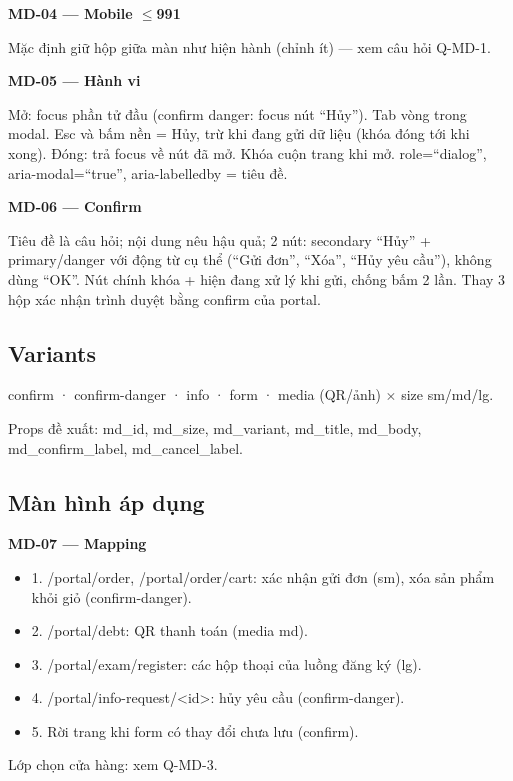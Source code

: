 \documentclass[11pt,a4paper]{report}
\begin{document}
\par\smallskip\textbf{MD-04 — Mobile \(\leq\)991}\par
Mặc định giữ hộp giữa màn như hiện hành (chỉnh ít) — xem câu hỏi Q-MD-1.\par

\par\smallskip\textbf{MD-05 — Hành vi}\par
Mở: focus phần tử đầu (confirm danger: focus nút “Hủy”). Tab vòng trong modal. Esc và bấm nền = Hủy, trừ khi đang gửi dữ liệu (khóa đóng tới khi xong). Đóng: trả focus về nút đã mở. Khóa cuộn trang khi mở. role=“dialog”, aria-\allowbreak{}modal=“true”, aria-\allowbreak{}labelledby = tiêu đề.\par

\par\smallskip\textbf{MD-06 — Confirm}\par
Tiêu đề là câu hỏi; nội dung nêu hậu quả; 2 nút: secondary “Hủy” + primary/\allowbreak{}danger với động từ cụ thể (“Gửi đơn”, “Xóa”, “Hủy yêu cầu”), không dùng “OK”. Nút chính khóa + hiện đang xử lý khi gửi, chống bấm 2 lần. Thay 3 hộp xác nhận trình duyệt bằng confirm của portal.\par
\subsection*{Variants}
confirm · confirm-\allowbreak{}danger · info · form · media (QR/\allowbreak{}ảnh) \(\times\) size sm/\allowbreak{}md/\allowbreak{}lg.\par
Props đề xuất: md\_id, md\_size, md\_variant, md\_title, md\_body, md\_confirm\_label, md\_cancel\_label.\par
\subsection*{Màn hình áp dụng}
\par\smallskip\textbf{MD-07 — Mapping}\par
\begin{itemize}[label={}]
\item 1. /portal/\allowbreak{}order, /portal/\allowbreak{}order/\allowbreak{}cart: xác nhận gửi đơn (sm), xóa sản phẩm khỏi giỏ (confirm-\allowbreak{}danger).
\item 2. /portal/\allowbreak{}debt: QR thanh toán (media md).
\item 3. /portal/\allowbreak{}exam/\allowbreak{}register: các hộp thoại của luồng đăng ký (lg).
\item 4. /portal/\allowbreak{}info-\allowbreak{}request/\allowbreak{}\textless{}id\textgreater{}: hủy yêu cầu (confirm-\allowbreak{}danger).
\item 5. Rời trang khi form có thay đổi chưa lưu (confirm).
\end{itemize}
Lớp chọn cửa hàng: xem Q-MD-3.\par
\end{document}
